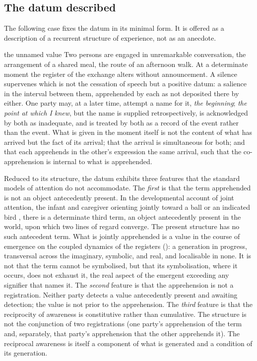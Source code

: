 \subsection{The datum described}
\label{p10:sec:bare}

The following case fixes the datum in its minimal form. It is offered as a description of a recurrent structure of experience, not as an anecdote.

\begin{casebox}{the unnamed value}
Two persons are engaged in unremarkable conversation, the arrangement of a shared meal, the route of an afternoon walk. At a determinate moment the register of the exchange alters without announcement. A silence supervenes which is not the cessation of speech but a positive datum: a salience in the interval between them, apprehended by each as not deposited there by either. One party may, at a later time, attempt a name for it, \emph{the beginning}; \emph{the point at which I knew}, but the name is supplied retrospectively, is acknowledged by both as inadequate, and is treated by both as a record of the event rather than the event. What is given in the moment itself is not the content of what has arrived but the fact of its arrival; that the arrival is simultaneous for both; and that each apprehends in the other's expression the same arrival, such that the co-apprehension is internal to what is apprehended.
\end{casebox}

\noindent
Reduced to its structure, the datum exhibits three features that the standard models of attention do not accommodate. The \emph{first} is that the term apprehended is not an object antecedently present. In the developmental account of joint attention, the infant and caregiver orienting jointly toward a ball or an indicated bird \parencite{trevarthen1979,zahavi1975}, there is a determinate third term, an object antecedently present in the world, upon which two lines of regard converge. The present structure has no such antecedent term. What is jointly apprehended is a value in the course of emergence on the coupled dynamics of the registers (): a generation in progress, transversal across the imaginary, symbolic, and real, and localisable in none. It is not that the term cannot be symbolised, but that its symbolisation, where it occurs, does not exhaust it, the real aspect of the emergent exceeding any signifier that names it. The \emph{second} feature is that the apprehension is not a registration. Neither party detects a value antecedently present and awaiting detection; the value is not prior to the apprehension. The \emph{third} feature is that the reciprocity of awareness is constitutive rather than cumulative. The structure is not the conjunction of two registrations (one party's apprehension of the term and, separately, that party's apprehension that the other apprehends it). The reciprocal awareness is itself a component of what is generated and a condition of its generation.

